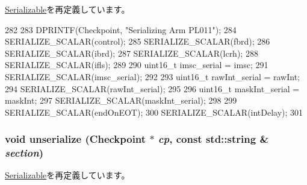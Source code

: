 \hyperlink{classSerializable_ad6272f80ae37e8331e3969b3f072a801}{Serializable}を再定義しています。


\begin{DoxyCode}
282 {
283     DPRINTF(Checkpoint, "Serializing Arm PL011\n");
284     SERIALIZE_SCALAR(control);
285     SERIALIZE_SCALAR(fbrd);
286     SERIALIZE_SCALAR(ibrd);
287     SERIALIZE_SCALAR(lcrh);
288     SERIALIZE_SCALAR(ifls);
289 
290     uint16_t imsc_serial = imsc;
291     SERIALIZE_SCALAR(imsc_serial);
292 
293     uint16_t rawInt_serial = rawInt;
294     SERIALIZE_SCALAR(rawInt_serial);
295 
296     uint16_t maskInt_serial = maskInt;
297     SERIALIZE_SCALAR(maskInt_serial);
298 
299     SERIALIZE_SCALAR(endOnEOT);
300     SERIALIZE_SCALAR(intDelay);
301 }
\end{DoxyCode}
\hypertarget{classPl011_af22e5d6d660b97db37003ac61ac4ee49}{
\subsubsection[{unserialize}]{\setlength{\rightskip}{0pt plus 5cm}void unserialize ({\bf Checkpoint} $\ast$ {\em cp}, \/  const std::string \& {\em section})}}
\label{classPl011_af22e5d6d660b97db37003ac61ac4ee49}


\hyperlink{classSerializable_af100c4e9feabf3cd918619c88c718387}{Serializable}を再定義しています。


